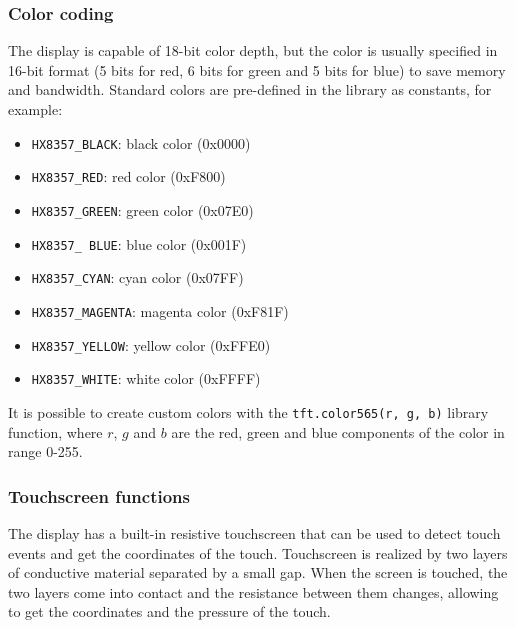 \subsubsection*{Color coding}
The display is capable of 18-bit color depth, but the color is usually specified in 16-bit format (5 bits for red, 6 bits for
green and 5 bits for blue) to save memory and bandwidth. Standard colors are pre-defined in the library as constants, for example:
\begin{center}
	\begin{minipage}{0.45\textwidth}
		\begin{itemize}
			\item \texttt{HX8357\_BLACK}: black color (0x0000)
			\item \texttt{HX8357\_RED}: red color (0xF800)
			\item \texttt{HX8357\_GREEN}: green color (0x07E0)
			\item \texttt{HX8357\_ BLUE}: blue color (0x001F)
		\end{itemize}
	\end{minipage}
	\begin{minipage}{0.5\textwidth}
		\begin{itemize}
			\item \texttt{HX8357\_CYAN}: cyan color (0x07FF)
			\item \texttt{HX8357\_MAGENTA}: magenta color (0xF81F)
			\item \texttt{HX8357\_YELLOW}: yellow color (0xFFE0)
			\item \texttt{HX8357\_WHITE}: white color (0xFFFF)
		\end{itemize}
	\end{minipage}
\end{center}
It is possible to create custom colors with the \texttt{tft.color565(r, g, b)} library function, where \(r\), \(g\) and \(b\)
are the red, green and blue components of the color in range 0-255.

\subsubsection*{Touchscreen functions}
The display has a built-in resistive touchscreen that can be used to detect touch events and get the coordinates of the touch.
Touchscreen is realized by two layers of conductive material separated by a small gap. When the screen is touched, the two layers
come into contact and the resistance between them changes, allowing to get the coordinates and the pressure of the touch.

